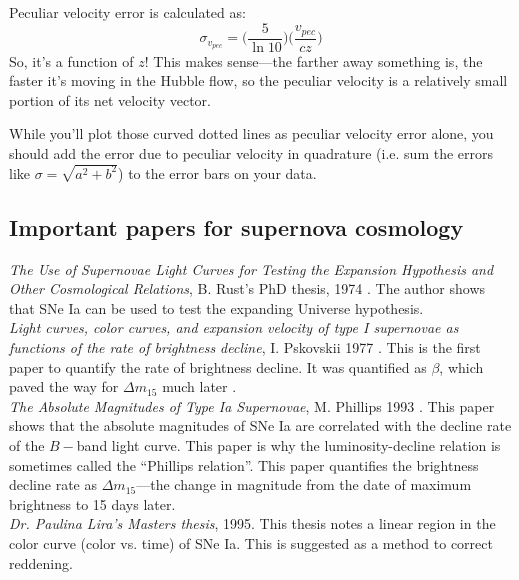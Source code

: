 Peculiar velocity error is calculated as:
\begin{equation}
    \sigma_{v_{pec}} = \Big( \frac{5}{\ln 10} \Big) \Big( \frac{v_{pec}}{cz} \Big)
\end{equation}
So, it's a function of $z$! This makes sense---the farther away something is, the faster it's moving in the Hubble flow, so the peculiar velocity is a relatively small portion of its net velocity vector. 

While you'll plot those curved dotted lines as peculiar velocity error alone, you should add the error due to peculiar velocity in quadrature (i.e. sum the errors like $\sigma = \sqrt{a^{2} + b^{2}}$) to the error bars on your data.

\subsection{Important papers for supernova cosmology}

\textit{The Use of Supernovae Light Curves for Testing the Expansion Hypothesis and Other Cosmological Relations}, B. Rust's PhD thesis, 1974 \cite{Rust1974}. The author shows that SNe Ia can be used to test the expanding Universe hypothesis.\\

\noindent\textit{Light curves, color curves, and expansion velocity of type I supernovae as functions of the rate of brightness decline}, I. Pskovskii 1977 \cite{Pskovskii1977}. This is the first paper to quantify the rate of brightness decline. It was quantified as $\beta$, which paved the way for $\Delta m_{15}$ much later \cite{Phillips1993}. \\

\noindent\textit{The Absolute Magnitudes of Type Ia Supernovae}, M. Phillips 1993 \cite{Phillips1993}. This paper shows that the absolute magnitudes of SNe Ia are correlated with the decline rate of the $B-$band light curve. This paper is why the luminosity-decline relation is sometimes called the ``Phillips relation''. This paper quantifies the brightness decline rate as $\Delta m_{15}$---the change in magnitude from the date of maximum brightness to 15 days later.\\

\noindent\textit{Dr. Paulina Lira's Masters thesis}, 1995. This thesis notes a linear region in the color curve (color vs. time) of SNe Ia. This is suggested as a method to correct reddening. \\

